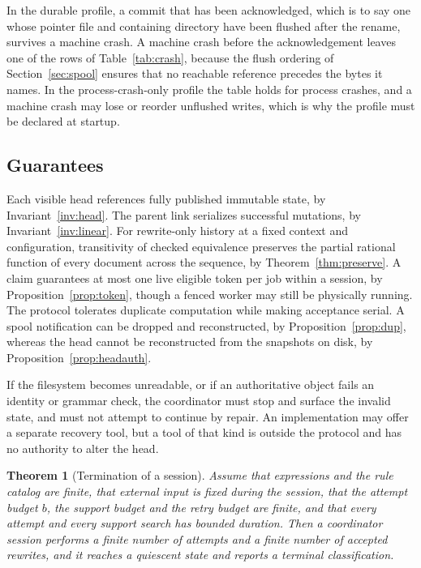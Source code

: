 \documentclass[11pt,a4paper]{article}
\theoremstyle{plain}
\newtheorem{theorem}{Theorem}[section]
\theoremstyle{definition}
\theoremstyle{remark}
\theoremstyle{definition}
\begin{document}
In the durable profile, a commit that has been acknowledged, which is to say one whose pointer file and containing directory have been flushed after the rename, survives a machine crash. A machine crash before the acknowledgement leaves one of the rows of Table~\ref{tab:crash}, because the flush ordering of Section~\ref{sec:spool} ensures that no reachable reference precedes the bytes it names. In the process-crash-only profile the table holds for process crashes, and a machine crash may lose or reorder unflushed writes, which is why the profile must be declared at startup.

\subsection{Guarantees}

Each visible head references fully published immutable state, by Invariant~\ref{inv:head}. The parent link serializes successful mutations, by Invariant~\ref{inv:linear}. For rewrite-only history at a fixed context and configuration, transitivity of checked equivalence preserves the partial rational function of every document across the sequence, by Theorem~\ref{thm:preserve}. A claim guarantees at most one live eligible token per job within a session, by Proposition~\ref{prop:token}, though a fenced worker may still be physically running. The protocol tolerates duplicate computation while making acceptance serial. A spool notification can be dropped and reconstructed, by Proposition~\ref{prop:dup}, whereas the head cannot be reconstructed from the snapshots on disk, by Proposition~\ref{prop:headauth}.

If the filesystem becomes unreadable, or if an authoritative object fails an identity or grammar check, the coordinator must stop and surface the invalid state, and must not attempt to continue by repair. An implementation may offer a separate recovery tool, but a tool of that kind is outside the protocol and has no authority to alter the head.

\begin{theorem}[Termination of a session]
\label{thm:termination}
Assume that expressions and the rule catalog are finite, that external input is fixed during the session, that the attempt budget $b$, the support budget and the retry budget are finite, and that every attempt and every support search has bounded duration. Then a coordinator session performs a finite number of attempts and a finite number of accepted rewrites, and it reaches a quiescent state and reports a terminal classification.
\end{theorem}
\end{document}
